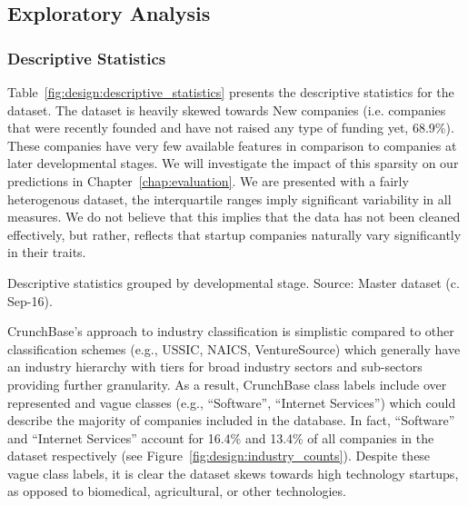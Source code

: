 \documentclass[../thesis/thesis.tex]{subfiles}
\begin{document}
\subsection{Exploratory Analysis}

\subsubsection{Descriptive Statistics}

Table~\ref{fig:design:descriptive_statistics} presents the descriptive statistics for the dataset. The dataset is heavily skewed towards New companies (i.e. companies that were recently founded and have not raised any type of funding yet, 68.9\%). These companies have very few available features in comparison to companies at later developmental stages. We will investigate the impact of this sparsity on our predictions in Chapter~\ref{chap:evaluation}. We are presented with a fairly heterogenous dataset, the interquartile ranges imply significant variability in all measures. We do not believe that this implies that the data has not been cleaned effectively, but rather, reflects that startup companies naturally vary significantly in their traits.

\begin{table}[!htb]
    \centering
    \scalebox{0.9}{}
    \caption[Descriptive statistics]{Descriptive statistics grouped by developmental stage. Source: Master dataset (c. Sep-16).}
    \label{fig:design:descriptive_statistics}
\end{table}

CrunchBase's approach to industry classification is simplistic compared to other classification schemes (e.g., USSIC, NAICS, VentureSource) which generally have an industry hierarchy with tiers for broad industry sectors and sub-sectors providing further granularity. As a result, CrunchBase class labels include over represented and vague classes (e.g., ``Software'', ``Internet Services'') which could describe the majority of companies included in the database. In fact, ``Software'' and ``Internet Services'' account for 16.4\% and 13.4\% of all companies in the dataset respectively (see Figure~\ref{fig:design:industry_counts}). Despite these vague class labels, it is clear the dataset skews towards high technology startups, as opposed to biomedical, agricultural, or other technologies.
\end{document}
